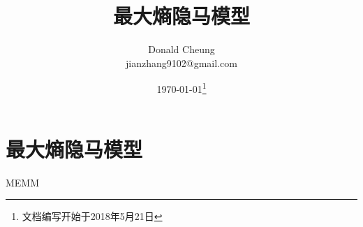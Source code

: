 \ifx\mlnotes\undefined
    \providecommand{\notesroot}{../..}
    \providecommand{\memmroot}{.}

    \title{最大熵隐马模型}
    \author{Donald Cheung\\jianzhang9102@gmail.com}
    \date{\today\footnote{文档编写开始于2018年5月21日}}

    
\else
    \providecommand{\memmroot}{\mlroot/memm}
\fi

\chapter{最大熵隐马模型}
MEMM

\ifx\mlnotes\undefined
    
\fi
